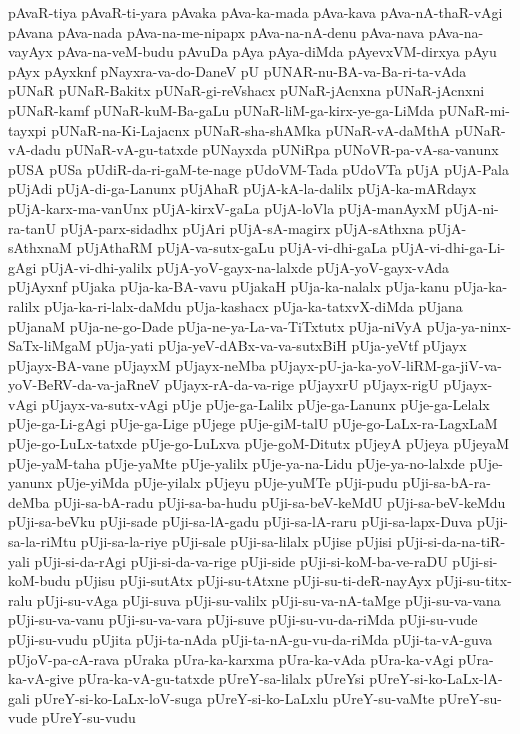{pAvaR-tiya
pAvaR-ti-yara
pAvaka
pAva-ka-mada
pAva-kava
pAva-nA-thaR-vAgi
pAvana
pAva-nada
pAva-na-me-nipapx
pAva-na-nA-denu
pAva-nava
pAva-na-vayAyx
pAva-na-veM-budu
pAvuDa
pAya
pAya-diMda
pAyevxVM-dirxya
pAyu
pAyx
pAyxknf
pNayxra-va-do-DaneV
pU
pUNAR-nu-BA-va-Ba-ri-ta-vAda
pUNaR
pUNaR-Bakitx
pUNaR-gi-reVshacx
pUNaR-jAcnxna
pUNaR-jAcnxni
pUNaR-kamf
pUNaR-kuM-Ba-gaLu
pUNaR-liM-ga-kirx-ye-ga-LiMda
pUNaR-mi-tayxpi
pUNaR-na-Ki-Lajacnx
pUNaR-sha-shAMka
pUNaR-vA-daMthA
pUNaR-vA-dadu
pUNaR-vA-gu-tatxde
pUNayxda
pUNiRpa
pUNoVR-pa-vA-sa-vanunx
pUSA
pUSa
pUdiR-da-ri-gaM-te-nage
pUdoVM-Tada
pUdoVTa
pUjA
pUjA-Pala
pUjAdi
pUjA-di-ga-Lanunx
pUjAhaR
pUjA-kA-la-dalilx
pUjA-ka-mARdayx
pUjA-karx-ma-vanUnx
pUjA-kirxV-gaLa
pUjA-loVla
pUjA-manAyxM
pUjA-ni-ra-tanU
pUjA-parx-sidadhx
pUjAri
pUjA-sA-magirx
pUjA-sAthxna
pUjA-sAthxnaM
pUjAthaRM
pUjA-va-sutx-gaLu
pUjA-vi-dhi-gaLa
pUjA-vi-dhi-ga-Li-gAgi
pUjA-vi-dhi-yalilx
pUjA-yoV-gayx-na-lalxde
pUjA-yoV-gayx-vAda
pUjAyxnf
pUjaka
pUja-ka-BA-vavu
pUjakaH
pUja-ka-nalalx
pUja-kanu
pUja-ka-ralilx
pUja-ka-ri-lalx-daMdu
pUja-kashacx
pUja-ka-tatxvX-diMda
pUjana
pUjanaM
pUja-ne-go-Dade
pUja-ne-ya-La-va-TiTxtutx
pUja-niVyA
pUja-ya-ninx-SaTx-liMgaM
pUja-yati
pUja-yeV-dABx-va-va-sutxBiH
pUja-yeVtf
pUjayx
pUjayx-BA-vane
pUjayxM
pUjayx-neMba
pUjayx-pU-ja-ka-yoV-liRM-ga-jiV-va-yoV-BeRV-da-va-jaRneV
pUjayx-rA-da-va-rige
pUjayxrU
pUjayx-rigU
pUjayx-vAgi
pUjayx-va-sutx-vAgi
pUje
pUje-ga-Lalilx
pUje-ga-Lanunx
pUje-ga-Lelalx
pUje-ga-Li-gAgi
pUje-ga-Lige
pUjege
pUje-giM-talU
pUje-go-LaLx-ra-LagxLaM
pUje-go-LuLx-tatxde
pUje-go-LuLxva
pUje-goM-Ditutx
pUjeyA
pUjeya
pUjeyaM
pUje-yaM-taha
pUje-yaMte
pUje-yalilx
pUje-ya-na-Lidu
pUje-ya-no-lalxde
pUje-yanunx
pUje-yiMda
pUje-yilalx
pUjeyu
pUje-yuMTe
pUji-pudu
pUji-sa-bA-ra-deMba
pUji-sa-bA-radu
pUji-sa-ba-hudu
pUji-sa-beV-keMdU
pUji-sa-beV-keMdu
pUji-sa-beVku
pUji-sade
pUji-sa-lA-gadu
pUji-sa-lA-raru
pUji-sa-lapx-Duva
pUji-sa-la-riMtu
pUji-sa-la-riye
pUji-sale
pUji-sa-lilalx
pUjise
pUjisi
pUji-si-da-na-tiR-yali
pUji-si-da-rAgi
pUji-si-da-va-rige
pUji-side
pUji-si-koM-ba-ve-raDU
pUji-si-koM-budu
pUjisu
pUji-sutAtx
pUji-su-tAtxne
pUji-su-ti-deR-nayAyx
pUji-su-titx-ralu
pUji-su-vAga
pUji-suva
pUji-su-valilx
pUji-su-va-nA-taMge
pUji-su-va-vana
pUji-su-va-vanu
pUji-su-va-vara
pUji-suve
pUji-su-vu-da-riMda
pUji-su-vude
pUji-su-vudu
pUjita
pUji-ta-nAda
pUji-ta-nA-gu-vu-da-riMda
pUji-ta-vA-guva
pUjoV-pa-cA-rava
pUraka
pUra-ka-karxma
pUra-ka-vAda
pUra-ka-vAgi
pUra-ka-vA-give
pUra-ka-vA-gu-tatxde
pUreY-sa-lilalx
pUreYsi
pUreY-si-ko-LaLx-lA-gali
pUreY-si-ko-LaLx-loV-suga
pUreY-si-ko-LaLxlu
pUreY-su-vaMte
pUreY-su-vude
pUreY-su-vudu
}
